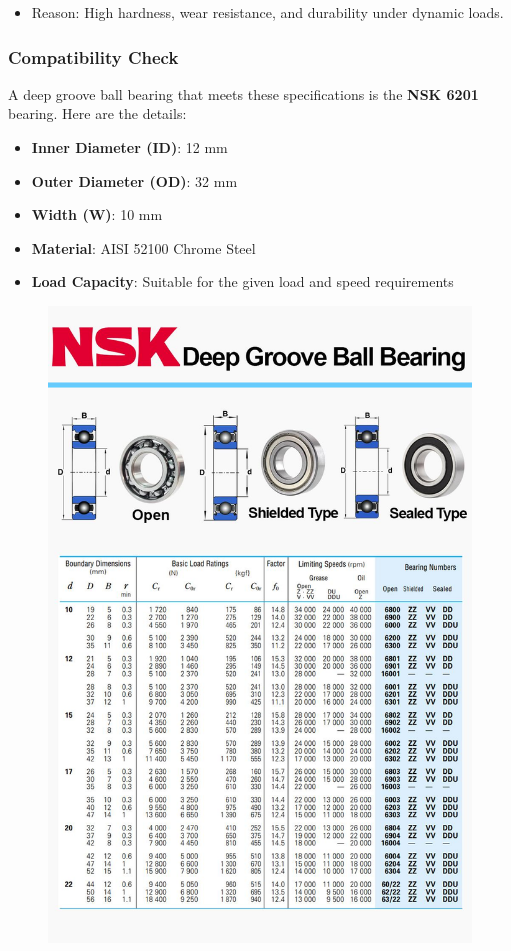 \documentclass[../../main]{subfiles}
\begin{document}
\begin{itemize}
\item
  Reason: High hardness, wear resistance, and durability under dynamic
  loads.
\end{itemize}

\subsubsection{Compatibility Check}

A deep groove ball bearing that meets these specifications is the
\textbf{NSK 6201} bearing. Here are the details:

\begin{itemize}
\item
  \textbf{Inner Diameter (ID)}: 12 mm
\item
  \textbf{Outer Diameter (OD)}: 32 mm
\item
  \textbf{Width (W)}: 10 mm
\item
  \textbf{Material}: AISI 52100 Chrome Steel
\item
  \textbf{Load Capacity}: Suitable for the given load and speed
  requirements
\end{itemize}

\newpage
\begin{figure}[H]
\centering
\includegraphics[width=\textwidth]{img/img1.jpg}
\caption{}
\end{figure}
\newpage
\end{document}
